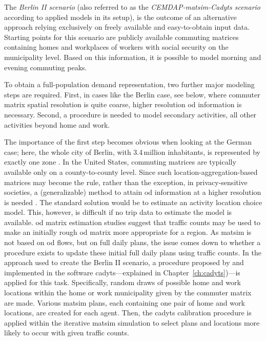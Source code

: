 The \textit{Berlin II scenario} (also referred to as the \emph{CEMDAP-\gls{matsim}-Cadyts scenario} according to applied models in its setup), is the outcome of an alternative approach relying exclusively on freely available and easy-to-obtain input data. Starting points for this scenario are publicly available commuting matrices containing homes and workplaces of workers with social security on the municipality level. Based on this information, it is possible to model morning and evening commuting peaks.

To obtain a full-population demand representation, two further major modeling steps are required. First, in cases like the Berlin case, see below, where commuter matrix spatial resolution is quite coarse, higher resolution \gls{od} information is necessary. Second, a procedure is needed to model secondary activities, \ie all other activities beyond home and work.

The importance of the first step becomes obvious when looking at the German case; here, the whole city of Berlin, with 3.4\,million inhabitants, is represented by exactly one zone \citep{BA2010Pendlerstatistik}. In the United States, commuting matrices are typically available only on a county-to-county level. Since such location-aggregation-based matrices may become the rule, rather than the exception, in privacy-sensitive societies, a (generalizable) method to attain \gls{od} information at a higher resolution is needed \citep{ZiemkeNagelBhat2015IntegratingCemdapMatsimTransferabilityTRB}. The standard solution would be to estimate an activity location choice model. This, however, is difficult if no trip data to estimate the model is available. \gls{od} matrix estimation studies \citep{ZuylenWillumsenMatrix-from-cnts} suggest that traffic counts may be used to make an initially rough \gls{od} matrix more appropriate for a region. As \gls{matsim} is not based on \gls{od} flows, but on full daily plans, the issue comes down to whether a procedure exists to update these initial full daily plans using traffic counts. In the approach used to create the Berlin II scenario, a procedure proposed by \citet{floetteroed-2010e} and implemented in the software \gls{cadyts}---explained in Chapter~\ref{ch:cadyts})---is applied for this task. Specifically, random draws of possible home and work locations within the home or work municipality given by the commuter matrix are made. Various \gls{matsim} plans, each containing one pair of home and work locations, are created for each agent. Then, the \gls{cadyts} calibration procedure is applied within the iterative \gls{matsim} simulation to select plans and locations more likely to occur with given traffic counts.

